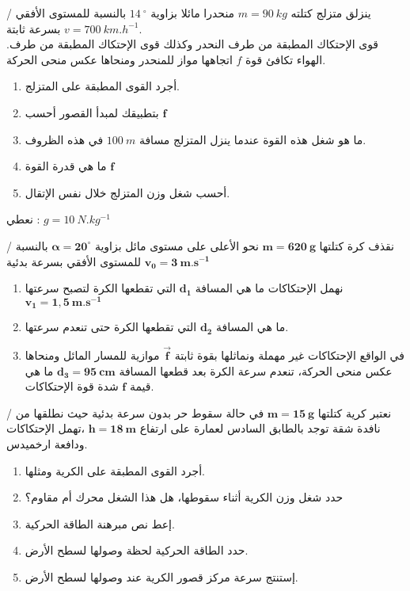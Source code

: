 \documentclass[12pt,a4paper]{article}
\begin{document}
					\begin{exercice}{}/
					ينزلق متزلج كتلته 
$m=90\ kg$					
					منحدرا مائلا بزاوية 
$14\ ^{\circ}$					
					بالنسبة للمستوى الأفقي بسرعة ثابتة 
$v= 700\ km.h^{-1}$.\\				
					.قوى الإحتكاك المطبقة من طرف النحدر وكذلك قوى الإحتكاك المطبقة من طرف الهواء تكافئ قوة 
$f$					
					اتجاهها مواز للمنحدر ومنحاها عكس منحى الحركة.
\begin{enumerate}
					\item أجرد القوى المطبقة على المتزلج.
					\item بتطبيقك لمبدأ القصور أحسب 
					$\bm{f}$
					\item ما هو شغل هذه القوة عندما ينزل المتزلج مسافة 
					$100\ m$
					في هذه الظروف.
					\item ما هي قدرة القوة
					$\bm{f}$
					\item أحسب شغل وزن المتزلج خلال نفس الإتقال.
					\end{enumerate}				
					نعطي :
					$g=10\ N.kg^{-1}$
					\end{exercice}%
					\begin{exercice}{}/
					نقذف كرة كتلتها 
$\bm{m=620\ g}$					
					نحو الأعلى على مستوى مائل بزاوية 
$\bm{\alpha =20^{\circ}}$					
					بالنسبة للمستوى الأفقي بسرعة بدئية 
$\bm{v_0=3\ m.s^{-1}}$					
					\begin{enumerate}
					\item نهمل الإحتكاكات ما هي المسافة 
$\bm{d_1}$					
					التي تقطعها الكرة لتصبح سرعتها 
$\bm{v_1=1,5\ m.s^{-1}}$				
				\item ما هي المسافة 
$\bm{d_2}$				
				التي تقطعها الكرة حتى تنعدم سرعتها.
				\item في الواقع الإحتكاكات غير مهملة ونماثلها بقوة ثابتة 
$\bm{\overrightarrow{f}}$			
				موازية للمسار المائل ومنحاها عكس منحى الحركة، تنعدم سرعة الكرة بعد قطعها المسافة 
$\bm{d_3=95\ cm}$				
				ما هي قيمة 
			$\bm{f}$	
				شدة قوة الإحتكاكات.
					\end{enumerate}
					\end{exercice}%
					\begin{exercice}{}/
					نعتبر كرية كتلتها 
$\bm{m=15\ g}$					
					في حالة سقوط حر بدون سرعة بدئية حيث نطلقها من نافدة شقة توجد بالطابق السادس لعمارة على ارتفاع 
$\bm{h=18\ m}$						
					،تهمل الإحتكاكات ودافعة ارخميدس.
					\begin{enumerate}
					\item أجرد القوى المطبقة على الكرية ومثلها.
					\item حدد شغل وزن الكرية أثناء سقوطها، هل هذا الشغل محرك أم مقاوم؟
					\item إعط نص مبرهنة الطاقة الحركية.
					\item حدد الطاقة الحركية لحظة وصولها لسطح الأرض.
					\item إستنتج سرعة مركز قصور الكرية عند وصولها لسطح الأرض.
					\end{enumerate}
					\end{exercice}%
\end{document}
